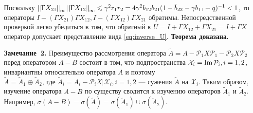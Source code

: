 Поскольку $\left\|\Gamma X_{21}\right\|_\infty \left\|\Gamma X_{12}\right\|_\infty \leqslant \gamma^2 r_1 r_2 = 4 \gamma^2 b_{12} b_{21} (1 - \tilde b_{22} - \gamma b_{11} + q)^{-1} \\ < 1$, то операторы
$I - (\Gamma X_{21})\Gamma X_{12}, I - (\Gamma X_{12})\Gamma X_{21}$ обратимы. Непосредственной проверкой легко убедиться в том, что обратный к 
$U = I+\Gamma X_{12} + \Gamma X_{21} = I + \Gamma X$ оператор допускает представление вида \eqref{eq:inverse_U}. \textbf{Теорема доказана.}

\textbf{Замечание~2.}
Преимущество рассмотрения оператора $\tilde A = A - \mathcal{P}_1 X \mathcal{P}_1 - \mathcal{P}_2 X \mathcal{P}_2$ перед оператором $A-B$ состоит в том, что подпространства 
$\mathcal{X}_i = \operatorname{Im}\mathcal{P}_i, i = 1,2$, инвариантны относительно оператора $A$ и поэтому \\ $\tilde A = \tilde A_1 \oplus \tilde A_2$, где 
$\tilde A_i = A_i - \mathcal{P}_iX | \mathcal{X}_i, i=1,2$ --- сужения $\tilde A$ на $\mathcal{X}_i$. Таким образом, изучение оператора $A-B$ по существу сводится к изучению операторов 
$\tilde A_1$ и $\tilde A_2$. Например, $\sigma(A-B) = \sigma(\tilde A) = \sigma(\tilde A_1) \cup \sigma(\tilde A_2)$.